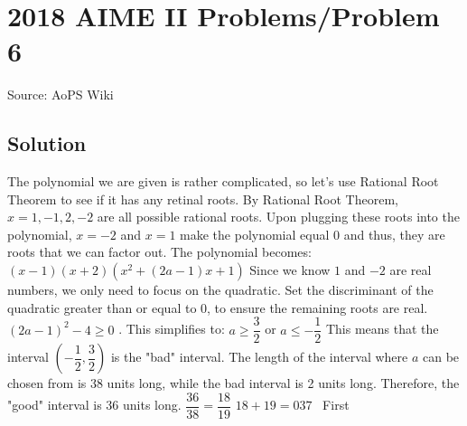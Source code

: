 \documentclass[12pt]{article}
\begin{document}
\section*{{2018 AIME II Problems/Problem 6}}
Source: AoPS Wiki

\subsection*{Solution}
The polynomial we are given is rather complicated, so let's use Rational Root Theorem to see if it has any retinal roots. By Rational Root Theorem, $x = 1, -1, 2, -2$ are all possible rational roots. Upon plugging these roots into the polynomial, $x = -2$ and $x = 1$ make the polynomial equal 0 and thus, they are roots that we can factor out. The polynomial becomes: $(x - 1)(x + 2)(x^2 + (2a - 1)x + 1)$ Since we know $1$ and $-2$ are real numbers, we only need to focus on the quadratic. Set the discriminant of the quadratic greater than or equal to 0, to ensure the remaining roots are real. $(2a - 1)^2 - 4 \geq 0$ . This simplifies to: $a \geq \dfrac{3}{2}$ or $a \leq -\dfrac{1}{2}$ This means that the interval $\left(-\dfrac{1}{2}, \dfrac{3}{2}\right)$ is the "bad" interval. The length of the interval where $a$ can be chosen from is 38 units long, while the bad interval is 2 units long. Therefore, the "good" interval is 36 units long. $\dfrac{36}{38} = \dfrac{18}{19}$ $18 + 19 = \boxed{037}$ ~First
\end{document}
